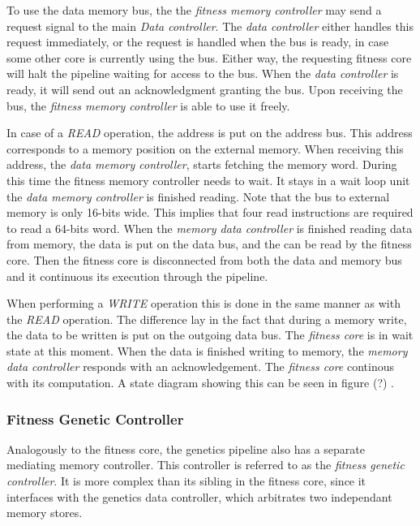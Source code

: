 To use the data memory bus, the the \emph{fitness memory controller} may send a request signal to the main \emph{Data controller}. 
The \emph{data controller} either handles this request immediately, or the request is handled when the bus is ready, in case some other core is currently using the bus.
Either way, the requesting fitness core will halt the pipeline waiting for access to the bus.
When the \emph{data controller} is ready, it will send out an acknowledgment granting the bus.
Upon receiving the bus, the \emph{fitness memory controller} is able to use it freely. 

In case of a \emph{READ} operation, the address is put on the address bus. This address corresponds to a memory position on the external memory. When receiving this address, the \emph{data memory controller}, starts fetching the memory word. During this time the fitness memory controller needs to wait. It stays in a wait loop unit the \emph{data memory controller} is finished reading. Note that the bus to external memory is only 16-bits wide. This implies that four read instructions are required to read a 64-bits word. When the \emph{memory data controller} is finished reading data from memory, the data is put on the data bus, and the can be read by the fitness core. Then the fitness core is disconnected from both the data and memory bus and it continuous its execution through the pipeline.


When performing a \emph{WRITE} operation this is done in the same manner as with the \emph{READ} operation. The difference lay in the fact that during a memory write, the data to be written is put on the outgoing data bus. The \emph{fitness core} is in wait state at this moment. When the data is finished writing to memory, the \emph{memory data controller} responds with an acknowledgement. The \emph{fitness core} continous with its computation.  
A state diagram showing this can be seen in figure (?) .   

\newpage
\subsubsection{Fitness Genetic Controller} 

Analogously to the fitness core, the genetics pipeline also has a separate mediating memory controller.
This controller is referred to as the \emph{fitness genetic controller}.
It is more complex than its sibling in the fitness core, since it interfaces with the genetics data controller, which arbitrates two independant memory stores.

